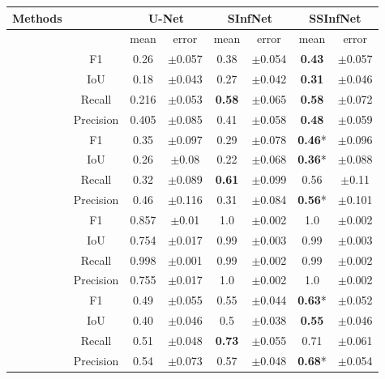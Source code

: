 \begin{table}[!h]
	\centering
	\begin{tabular}{ |c|c|c|c|c|c|c|c| }
		\hline
		Methods & & \multicolumn{2}{c|}{U-Net} & \multicolumn{2}{c|}{SInfNet} & \multicolumn{2}{c|}{SSInfNet}  \\ \hline
		&  &mean & error & mean & error & mean & error \\ \hline
		
		\multirow{4}{*}{\rotatebox[origin=c]{90}{GGO}} 
		& F1 & 0.26 & $\pm$0.057 & 0.38 &$\pm$0.054 & \textbf{0.43} & $\pm$0.057 \\ \cline{2-8}
		& IoU & 0.18 &$\pm$0.043 &0.27 &$\pm$0.042 &
		\textbf{0.31} &$\pm$0.046 \\ \cline{2-8}
		& Recall & 0.216 &$\pm$0.053 &\textbf{0.58} &$\pm$0.065 &\textbf{0.58} &$\pm$0.072 \\ \cline{2-8}
		& Precision & 0.405 &$\pm$0.085 &0.41 &$\pm$0.058 &
		\textbf{0.48} &$\pm$0.059 \\ \cline{2-8}
		\hline \hline
		
		\multirow{4}{*}{\rotatebox[origin=c]{90}{Cons}} 
		& F1 & 0.35 &$\pm$0.097 &0.29 &$\pm$0.078 &\textbf{0.46}* &$\pm$0.096 \\ \cline{2-8}
		& IoU & 0.26& $\pm$0.08&0.22 &$\pm$0.068 &\textbf{0.36}* &$\pm$0.088 \\ \cline{2-8}
		& Recall &0.32 &$\pm$0.089 &\textbf{0.61} &$\pm$0.099 &0.56 &$\pm$0.11 \\ \cline{2-8}
		& Precision & 0.46 &$\pm$0.116 &0.31 &$\pm$0.084 &\textbf{0.56}* &$\pm$0.101 \\ \cline{2-8}
		\hline \hline
		
		\multirow{4}{*}{\rotatebox[origin=c]{90}{Background}} 
		& F1 & 0.857&$\pm$0.01 &1.0 &$\pm$0.002 &1.0 &$\pm$0.002 \\ \cline{2-8}
		& IoU & 0.754&$\pm$0.017 &0.99 &$\pm$0.003 &0.99 &$\pm$0.003 \\ \cline{2-8}
		& Recall &0.998 &$\pm$0.001 &0.99 &$\pm$0.002 &0.99 &$\pm$0.002 \\ \cline{2-8}
		& Precision &0.755 &$\pm$0.017 &1.0 &$\pm$0.002 &1.0 &$\pm$0.002 \\ \cline{2-8}
		\hline \hline
		
		\multirow{4}{*}{\rotatebox[origin=c]{90}{Overall}} 
		& F1 &0.49 &$\pm$0.055 &0.55 &$\pm$0.044 &\textbf{0.63}* &$\pm$0.052 \\ \cline{2-8}
		& IoU & 0.40 &$\pm$0.046 &0.5 &$\pm$0.038 &\textbf{0.55} &$\pm$0.046 \\ \cline{2-8}
		& Recall &0.51 &$\pm$0.048 &\textbf{0.73} &$\pm$0.055 &0.71 &$\pm$0.061 \\ \cline{2-8}
		& Precision &0.54 &$\pm$0.073 &0.57 &$\pm$0.048 &\textbf{0.68}* &$\pm$0.054 \\ \cline{2-8}
		\hline \hline
		

\end{tabular}
\end{table}
